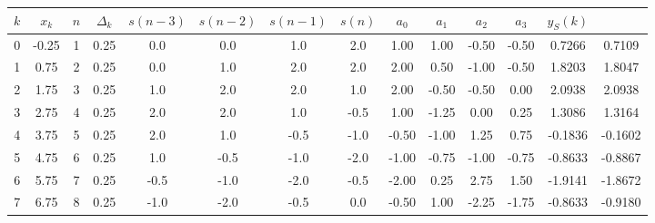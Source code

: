 \documentclass[border=3mm]{standalone}
\begin{document}
\begin{tabular}{
		*{1}{S[table-format = 2.0]}
		*{1}{S[table-format = 2.2]}
		*{1}{S[table-format = 2.0]}
		*{1}{S[table-format = 2.2]}
		*{1}{S[table-format = 3.1]}
		*{1}{S[table-format = 3.1]}
		*{1}{S[table-format = 3.1]}
		*{1}{S[table-format = 3.1]}
		*{1}{S[table-format = 3.3]}
		*{1}{S[table-format = 3.3]}
		*{1}{S[table-format = 3.3]}
		*{1}{S[table-format = 3.3]}
		*{1}{S[table-format = 3.4]}
		*{1}{S[table-format = 3.4]}
	}
	
\toprule
{$k$} & {$x_k$}  &   {$n$}  &   {$\Delta_k$}  & {$s(n-3)$} &  {$s(n-2)$} &  {$s(n-1)$} &  {$s(n)$} & {$a_0$}  &  {$a_1$} & {$a_2$} & {$a_3$} & {$y_S(k)$} & \color{gray}{$y_L(k)$}\\  
 & -0.25 &  1 &  0.25  &	\color{red} 0.0	& \color{red} 0.0	&  1.0 &   2.0 				&   1.00 &   1.00 & -0.50 & -0.50 &  0.7266  &\color{gray}  0.7109 \\
  1 &  0.75 &  2 &  0.25  &	\color{red} 0.0	&  1.0  			&  2.0 &   2.0 				&   2.00 &   0.50 & -1.00 & -0.50 &  1.8203  &\color{gray}  1.8047 \\
  2 &  1.75 &  3 &  0.25  &   1.0   		&  2.0  			&  2.0 &   1.0 				&   2.00 &  -0.50 & -0.50 &  0.00 &  2.0938  &\color{gray}  2.0938 \\
  3 &  2.75 &  4 &  0.25  &   2.0   		&  2.0  			&  1.0 &  -0.5 				&   1.00 &  -1.25 &  0.00 &  0.25 &  1.3086  &\color{gray}  1.3164 \\
  4 &  3.75 &  5 &  0.25  &   2.0   		&  1.0  			& -0.5 &  -1.0 				&  -0.50 &  -1.00 &  1.25 &  0.75 & -0.1836  &\color{gray} -0.1602 \\
  5 &  4.75 &  6 &  0.25  &   1.0   		& -0.5  			& -1.0 &  -2.0 				&  -1.00 &  -0.75 & -1.00 & -0.75 & -0.8633  &\color{gray} -0.8867 \\
  6 &  5.75 &  7 &  0.25  &  -0.5   		& -1.0  			& -2.0 &  -0.5 				&  -2.00 &   0.25 &  2.75 &  1.50 & -1.9141  &\color{gray} -1.8672 \\
  7 &  6.75 &  8 &  0.25  &  -1.0   		& -2.0  			& -0.5 &  \color{red} 0.0	&  -0.50 &   1.00 & -2.25 & -1.75 & -0.8633  &\color{gray} -0.9180 \\
\bottomrule

\end{tabular}
\end{document}
